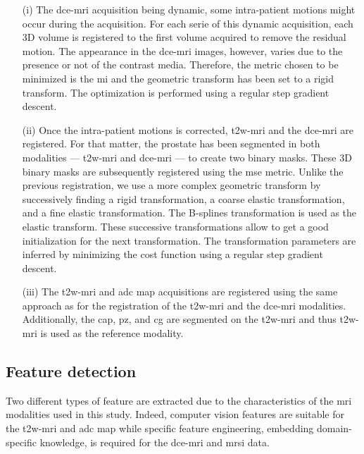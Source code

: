 \documentclass[final,3p,times,twocolumn]{elsarticle}
\begin{document}
\begin{itemize}

\item[(i)] The \ac{dce}-\ac{mri} acquisition being dynamic, some intra-patient
motions might occur during the acquisition. For each serie of this dynamic
acquisition, each 3D volume is registered to the first volume acquired to
remove the residual motion. The appearance in the \ac{dce}-\ac{mri} images,
however, varies due to the presence or not of the contrast media. Therefore,
the metric chosen to be minimized is the \ac{mi} and the geometric transform
has been set to a rigid transform. The optimization is performed using a
regular step gradient descent.

\item[(ii)] Once the intra-patient motions is corrected, \ac{t2w}-\ac{mri} and
the \ac{dce}-\ac{mri} are registered. For that matter, the prostate has been
segmented in both modalities --- \ac{t2w}-\ac{mri} and \ac{dce}-\ac{mri} --- to
create two binary masks. These 3D binary masks are subsequently
registered using the \ac{mse} metric. Unlike the previous registration, we use
a more complex geometric transform by successively finding a rigid
transformation, a coarse elastic transformation, and a fine elastic
transformation. The B-splines transformation is used as the elastic
transform. These successive transformations allow to get a good initialization
for the next transformation. The transformation parameters are inferred by
minimizing the cost function using a regular step gradient descent.

\item[(iii)] The \ac{t2w}-\ac{mri} and \ac{adc} map acquisitions are registered
using the same approach as for the registration of the \ac{t2w}-\ac{mri} and
the \ac{dce}-\ac{mri} modalities. Additionally, the \ac{cap}, \ac{pz}, and
\ac{cg} are segmented on the \ac{t2w}-\ac{mri} and thus \ac{t2w}-\ac{mri} is
used as the reference modality.

\end{itemize}

\subsection{Feature detection}

Two different types of feature are extracted due to the characteristics of the
\ac{mri} modalities used in this study. Indeed, computer vision features are
suitable for the \ac{t2w}-\ac{mri} and \ac{adc} map while specific feature
engineering, embedding domain-specific knowledge, is required for the
\ac{dce}-\ac{mri} and \ac{mrsi} data.
\end{document}
